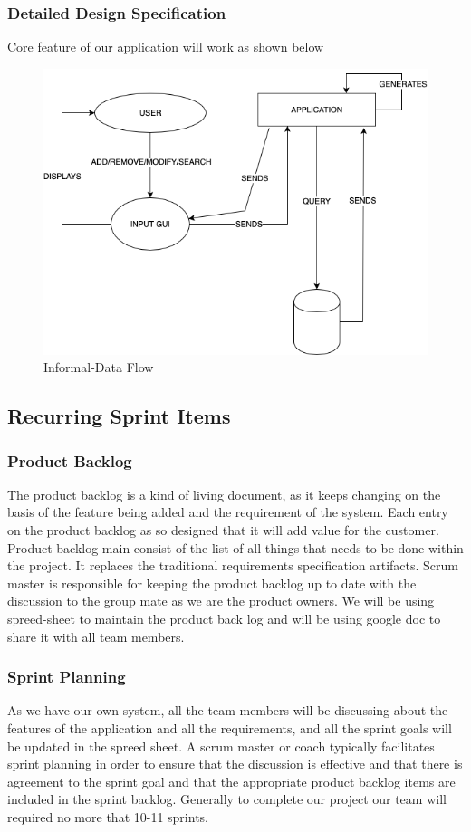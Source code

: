 \subsubsection{Detailed Design Specification}
    Core feature of our application will work as shown below
    \begin{figure}[h!]
        \centering
        \includegraphics[width=.5\textwidth]{images/core}
        \caption{Informal-Data Flow}
    \end{figure}


\subsection{Recurring Sprint Items}
\subsubsection{Product Backlog}
The product backlog is a kind of living document, as it keeps changing on the basis of the feature being added and the requirement of the system. Each entry on the product backlog as so designed that it will add value for the customer. Product backlog main consist of the  list of all things that needs to be done within the project. It replaces the traditional requirements specification artifacts. Scrum master is responsible for keeping the product backlog up to date with the discussion to the group mate as we are the product owners. We will be using spreed-sheet to maintain the product back log and will be using google doc to share it with all team members. 

\subsubsection{Sprint Planning}
As we have our own system, all the team members will be discussing about the features of the application and all the requirements, and all the sprint goals will be updated in the spreed sheet. A scrum master or coach typically facilitates sprint planning in order to ensure that the discussion is effective and that there is agreement to the sprint goal and that the appropriate product backlog items are included in the sprint backlog. Generally to complete our project our team will required no more that 10-11 sprints.

